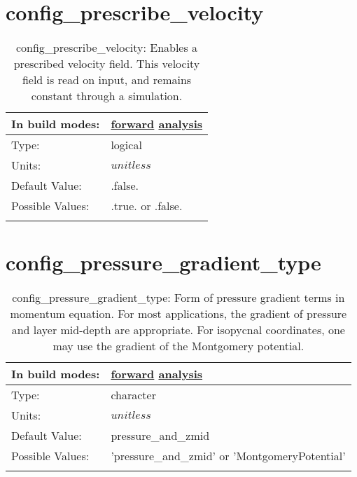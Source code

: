 \section[config\_prescribe\_velocity]{config\_prescribe\_velocity}
\label{sec:nm_sec_config_prescribe_velocity}
\begin{center}
\begin{longtable}{| p{2.0in} || p{4.0in} |}
    \hline
    In build modes: & \hyperref[subsec:forward_nm_tab_debug]{forward} \hyperref[subsec:analysis_nm_tab_debug]{analysis} \\
    \hline
    Type: & logical \\
    \hline
    Units: & $unitless$ \\
    \hline
    Default Value: & .false. \\
    \hline
    Possible Values: & .true. or .false. \\
    \hline
    \caption{config\_prescribe\_velocity: Enables a prescribed velocity field. This velocity field is read on input, and remains constant through a simulation.}
\end{longtable}
\end{center}
\section[config\_pressure\_gradient\_type]{config\_pressure\_gradient\_type}
\label{sec:nm_sec_config_pressure_gradient_type}
\begin{center}
\begin{longtable}{| p{2.0in} || p{4.0in} |}
    \hline
    In build modes: & \hyperref[subsec:forward_nm_tab_pressure_gradient]{forward} \hyperref[subsec:analysis_nm_tab_pressure_gradient]{analysis} \\
    \hline
    Type: & character \\
    \hline
    Units: & $unitless$ \\
    \hline
    Default Value: & pressure\_and\_zmid \\
    \hline
    Possible Values: & 'pressure\_and\_zmid' or 'MontgomeryPotential' \\
    \hline
    \caption{config\_pressure\_gradient\_type: Form of pressure gradient terms in momentum equation. For most applications, the gradient of pressure and layer mid-depth are appropriate.  For isopycnal coordinates, one may use the gradient of the Montgomery potential.}
\end{longtable}
\end{center}
